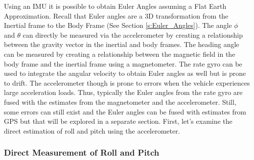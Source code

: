 \documentclass{article}
\begin{document}
Using an IMU it is possible to obtain Euler Angles assuming a Flat Earth Approximation. Recall that Euler angles are a 3D transformation from the Inertial frame to the Body Frame (See Section \ref{s:Euler_Angles}). The angle $\phi$ and $\theta$ can directly be measured via the accelerometer by creating a relationship between the gravity vector in the inertial and body frames. The heading angle can be measured by creating a relationship between the magnetic field in the body frame and the inertial frame using a magnetometer. The rate gyro can be used to integrate the angular velocity to obtain Euler angles as well but is prone to drift. The accelerometer though is prone to errors when the vehicle experiences large acceleration loads. Thus, typically the Euler angles from the rate gyro are fused with the estimates from the magnetometer and the accelerometer. Still, some errors can still exist and the Euler angles can be fused with estimates from GPS but that will be explored in a separate section. First, let's examine the direct estimation of roll and pitch using the accelerometer. 

\subsubsection{Direct Measurement of Roll and Pitch}
\end{document}
